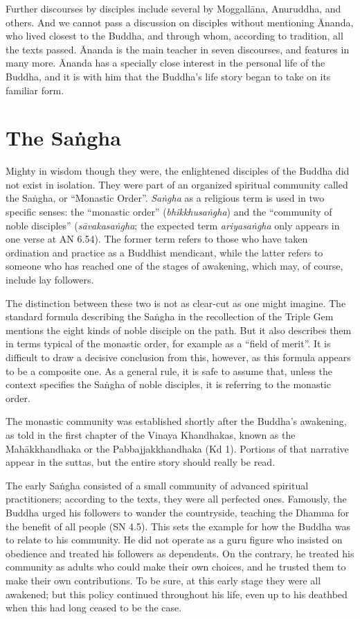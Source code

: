 \documentclass[12pt,openany]{book}%
\begin{document}
Further discourses by disciples include several by \textsanskrit{Moggallāna}, Anuruddha, and others. And we cannot pass a discussion on disciples without mentioning Ānanda, who lived closest to the Buddha, and through whom, according to tradition, all the texts passed. Ānanda is the main teacher in seven discourses, and features in many more. Ānanda has a specially close interest in the personal life of the Buddha, and it is with him that the Buddha’s life story began to take on its familiar form.

\section*{The \textsanskrit{Saṅgha}}

Mighty in wisdom though they were, the enlightened disciples of the Buddha did not exist in isolation. They were part of an organized spiritual community called the \textsanskrit{Saṅgha}, or “Monastic Order”. \textit{\textsanskrit{Saṅgha}} as a religious term is used in two specific senses: the “monastic order” (\textit{\textsanskrit{bhikkhusaṅgha}}) and the “community of noble disciples” (\textit{\textsanskrit{sāvakasaṅgha}}; the expected term \textit{\textsanskrit{ariyasaṅgha}} only appears in one verse at AN 6.54). The former term refers to those who have taken ordination and practice as a Buddhist mendicant, while the latter refers to someone who has reached one of the stages of awakening, which may, of course, include lay followers.

The distinction between these two is not as clear-cut as one might imagine. The standard formula describing the \textsanskrit{Saṅgha} in the recollection of the Triple Gem mentions the eight kinds of noble disciple on the path. But it also describes them in terms typical of the monastic order, for example as a “field of merit”. It is difficult to draw a decisive conclusion from this, however, as this formula appears to be a composite one. As a general rule, it is safe to assume that, unless the context specifies the \textsanskrit{Saṅgha} of noble disciples, it is referring to the monastic order.

The monastic community was established shortly after the Buddha’s awakening, as told in the first chapter of the Vinaya Khandhakas, known as the \textsanskrit{Mahākkhandhaka} or the Pabbajjakkhandhaka (Kd 1). Portions of that narrative appear in the suttas, but the entire story should really be read.

The early \textsanskrit{Saṅgha} consisted of a small community of advanced spiritual practitioners; according to the texts, they were all perfected ones. Famously, the Buddha urged his followers to wander the countryside, teaching the Dhamma for the benefit of all people (SN 4.5). This sets the example for how the Buddha was to relate to his community. He did not operate as a guru figure who insisted on obedience and treated his followers as dependents. On the contrary, he treated his community as adults who could make their own choices, and he trusted them to make their own contributions. To be sure, at this early stage they were all awakened; but this policy continued throughout his life, even up to his deathbed when this had long ceased to be the case.
\end{document}
